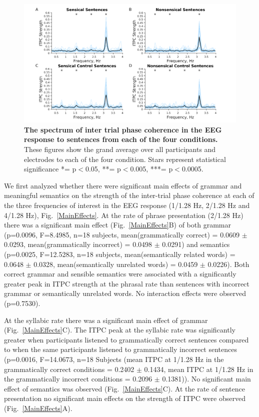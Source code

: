 \documentclass[10pt,letterpaper]{article}
\begin{document}
\begin{figure}[tbhp]
\includegraphics[width=\linewidth]{Grand_average_ITPC_per_condition_Grand_Average_ITPC_stats.png}
\caption{\textbf{The spectrum of inter trial phase coherence in the EEG response to sentences from each of the four conditions.} These figures show the grand average over all participants and electrodes to each of the four condition. Stars represent
statistical significance *= p$<$0.05, **= p$<$0.005, ***= p$<$0.0005.}
\label{Fig1}
\end{figure}

We first analyzed whether there were significant main effects of grammar and meaningful semantics on the strength of the inter-trial phase coherence at each of the three frequencies of interest in the EEG response (1/1.28 Hz, 2/1.28 Hz and 4/1.28 Hz), Fig.~\ref{MainEffects}. At the rate of phrase presentation (2/1.28 Hz) there was a significant main effect (Fig.~\ref{MainEffects}B) of both grammar (p=0.0096, F=8.4985, n=18 subjects, mean(grammatically correct) =  0.0609 $\pm$ 0.0293, mean(grammatically incorrect) = 0.0498 $\pm$ 0.0291) and semantics (p=0.0025, F=12.5283, n=18 subjects, mean(semantically related words) = 0.0648 $\pm$ 0.0328, mean(semantically unrelated words) = 0.0459 $\pm$ 0.0226). Both correct grammar and sensible semantics were associated with a significantly greater peak in ITPC strength at the phrasal rate than sentences with incorrect grammar or semantically unrelated words. No interaction effects were observed (p=0.7530).

At the syllabic rate there was a significant main effect of grammar (Fig.~\ref{MainEffects}C). The ITPC peak at the syllabic rate was significantly greater when participants listened to grammatically correct sentences compared to when the same participants listened to grammatically incorrect sentences (p=0.0016, F=14.0673, n=18 Subjects (mean ITPC at 1/1.28 Hz in the grammatically correct conditions = 0.2402 $\pm$ 0.1434, mean ITPC at 1/1.28 Hz in the grammatically incorrect conditions = 0.2096 $\pm$ 0.1381)). No significant main effect of semantics was observed (Fig.~\ref{MainEffects}C). At the rate of sentence presentation no significant main effects on the strength of ITPC were observed (Fig.~\ref{MainEffects}A).
\end{document}
